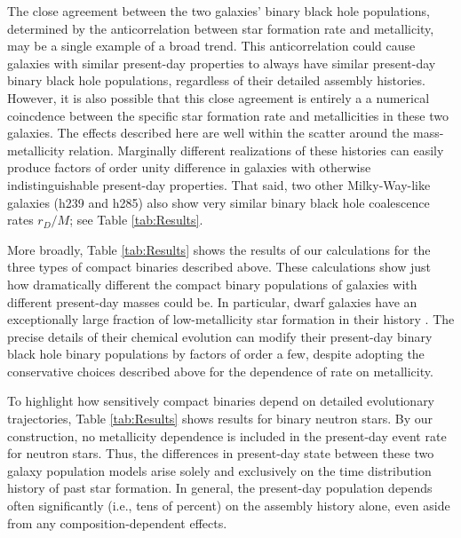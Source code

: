 \documentclass[nofootinbib,twocolumn,prd]{emulateapj}
\newcommand\editremark[1]{{\color{red}#1}}
\begin{document}
The close agreement between the two galaxies' binary black hole populations, determined by the anticorrelation between
star formation rate and metallicity, may be a single example of a broad trend.  This anticorrelation could cause
galaxies with similar present-day properties to always have similar present-day binary black hole populations,
regardless of their detailed assembly histories.
However, it is also possible that this close agreement is entirely a
a numerical coincdence between the specific star formation rate and metallicities in these two galaxies.  The effects described here
  are well within the scatter around the mass-metallicity relation.  Marginally different realizations of these
  histories can easily produce factors of order unity difference in galaxies with otherwise indistinguishable
  present-day properties.  That said, two other Milky-Way-like  galaxies (h239 and h285) also show very
  similar binary black hole coalescence rates $r_D/M$; see Table \ref{tab:Results}. %

More broadly, Table \ref{tab:Results} shows the results of our calculations for the three types of compact binaries
described above.   These calculations show just how dramatically different the compact binary populations of galaxies
with different present-day masses %
could be.   In particular, dwarf galaxies have an
exceptionally large fraction of low-metallicity star formation in their history \citep{Kirby13}.  The precise details of their chemical
evolution can modify their present-day binary black hole binary populations by factors of order a few, despite  adopting
the conservative choices described above for the dependence of rate on metallicity.  

To highlight how sensitively compact binaries depend on detailed evolutionary trajectories, Table \ref{tab:Results}
shows results for binary neutron stars.  By our construction, no metallicity dependence is included in the present-day
event rate for neutron stars.  Thus, the differences in
present-day state between these two galaxy population models arise solely and exclusively on the time distribution history of past star formation.  In general, the present-day population depends often significantly (i.e., tens of
percent) on the assembly history alone, even aside from any composition-dependent effects.
\end{document}
